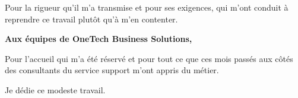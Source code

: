 \begin{center}
\begin{minipage}{0.84\textwidth}
\vspace{2mm}

Pour la rigueur qu'il m'a transmise et pour ses exigences, qui m'ont conduit à reprendre ce
travail plutôt qu'à m'en contenter.

\vspace{6mm}

\begin{center}
\textbf{\large Aux équipes de OneTech Business Solutions,}
\end{center}

\vspace{2mm}

Pour l'accueil qui m'a été réservé et pour tout ce que ces mois passés aux côtés des
consultants du service support m'ont appris du métier.

\vspace{7mm}

\begin{center}
Je dédie ce modeste travail.
\end{center}

\end{minipage}
\end{center}

\vfill
